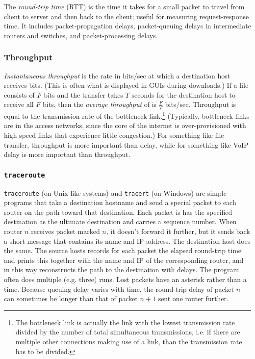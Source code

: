\documentclass[8pt, table, xcdraw]{article}%
\begin{document}
The \emph{round-trip time} (RTT) is the time it takes for a small packet to travel from client to server and then back to the client; useful for measuring request-response time. It includes packet-propagation delays, packet-queuing delays in intermediate routers and switches, and packet-processing delays.

\subsubsection{Throughput} \label{throughput}

\emph{Instantaneous throughput} is the rate in bits/sec at which a destination host receives bits. (This is often what is displayed in GUIs during downloads.) If a file consists of $F$ bits and the transfer takes $T$ seconds for the destination host to receive all $F$ bits, then the \emph{average throughput} of is $\frac{F}{T}$ bits/sec. Throughput is equal to the transmission rate of the bottleneck link.\footnote{The bottleneck link is actually the link with the lowest transmission rate divided by the number of total simultaneous transmissions, i.e. if there are multiple other connections making use of a link, than the transmission rate has to be divided.} (Typically, bottleneck links are in the access networks, since the core of the internet is over-provisioned with high speed links that experience little congestion.) For something like file transfer, throughput is more important than delay, while for something like VoIP delay is more important than throughput.

\subsubsection{\texttt{traceroute}}

\texttt{traceroute} (on Unix-like systems) and \texttt{tracert} (on Windows) are simple programs that take a destination hostname and send a special packet to each router on the path toward that destination. Each packet is has the specified destination as the ultimate destination and carries a sequence number. When router $n$ receives packet marked $n$, it doesn't forward it further, but it sends back a short message that contains its name and IP address. The destination host does the same. The source hosts records for each packet the elapsed round-trip time and prints this together with the name and IP of the corresponding router, and in this way reconstructs the path to the destination with delays. The program often does multiple (e.g. three) runs. Lost packets have an asterisk rather than a time. Because queuing delay varies with time, the round-trip delay of packet $n$ can sometimes be longer than that of packet $n+1$ sent one router further.
\end{document}
